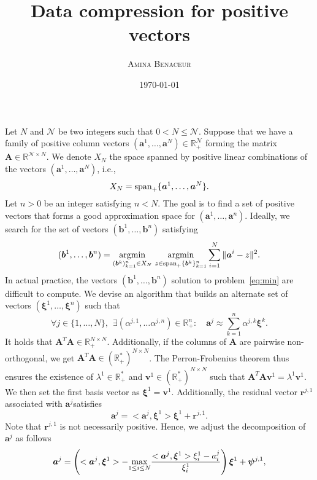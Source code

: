 \documentclass[12pt,a4paper]{article}
\title{ \bfseries \Huge {Data compression for positive vectors}}
\author{  \scshape  Amina Benaceur }
\date{\today}
\newcommand{\calN}{\mathcal N}
\newcommand{\R}{\mathbb R}
\begin{document}
	\maketitle
	Let $N$ and $\calN$ be two integers such that $0<N\leq\calN$.
	Suppose that we have a family of positive column vectors $(\bm a^1,\ldots,\bm a^N)\in\R_+^\calN$ forming the matrix $\bm A\in\R^{\calN\times N}$. 
	We denote $X_N$ the space spanned by positive linear combinations of the vectors $(\bm a^1,\ldots,\bm a^N)$, i.e., 
	$$
	X_N = {\rm span}_+ \{\bm a^1,\ldots,\bm a^N\}.
	$$
	Let $n>0$ be an integer satisfying $n<N$.
	The goal is to find a set of positive vectors that forms a good approximation space for $(\bm a^1,\ldots,\bm a^n)$.
	Ideally, we search for the set of vectors $(\bm b^1,\ldots,\bm b^n)$ satisfying
	\begin{equation}\label{eq:min}
		(\bm b^1,\ldots,\bm b^n) = \underset{(\bm b^k)_{k=1}^n\in X_N}{\rm argmin }\ \underset{z\in {\rm span}_+ \{\bm b^k\}_{k=1}^n}{\rm argmin} \sum_{i=1}^{N}\|\bm a^i-z\|^2.
	\end{equation}
	In actual practice, the vectors $(\bm b^1,\ldots,\bm b^n)$ solution to problem~\eqref{eq:min} are difficult to compute.
	We devise an algorithm that builds an alternate set of vectors $(\bm \xi^1,\ldots,\bm \xi^n)$ such that
	\begin{equation}
	\forall j\in\{1,\ldots,N\},\ \ \exists (\alpha^{j,1},\ldots\alpha^{j,n})\in\R_+^n:\quad	\bm a^j\approx \sum_{k=1}^n \alpha^{j,k} \bm \xi^k.
	\end{equation}
	It holds that $\bm A^T\bm A\in\R_+^{N\times N}$.
	Additionally, if the columns of $\bm A$ are pairwise non-orthogonal, we get  $\bm A^T\bm A\in{(\R_+^*)}^{N\times N}$.
	The Perron-Frobenius theorem thus ensures the existence of $\lambda^1\in\R_+^*$ and $\bm v^1\in(\R_+^*)^{N\times N}$ such that $\bm A^T\bm A\bm v^1 = \lambda^1\bm v^1$. 
	We then set the first basis vector as $\bm \xi^1 = \bm v^1$.
	Additionally, the residual vector $\bm r^{j,1}$ associated with $\bm a^j$satisfies 
	\begin{equation}
	\bm a^j = <\bm a^j, \bm \xi^1> \bm \xi^1+	\bm r^{j,1}.
	\end{equation}
	Note that $	\bm r^{j,1}$ is not necessarily positive.
	Hence, we adjust the decomposition of $	\bm a^j$ as follows
	\begin{equation}\label{eq:pos_dec}
		\bm a^j = \left( <\bm a^j, \bm \xi^1> - \underset{1\leq i\leq N}{\rm max}\frac{<\bm a^j, \bm \xi^1>\xi^1_i -  a^j_i}{\xi^1_i}\right)\bm \xi^1 +\bm \psi^{j,1},
	\end{equation}
\end{document}
